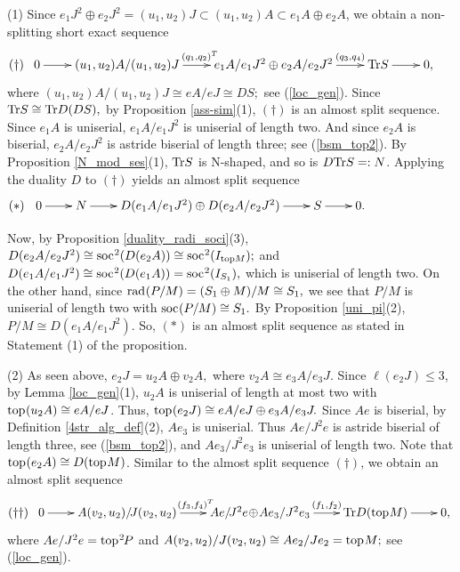\documentclass[10pt]{amsart}
\theoremstyle{definition}
\newcommand{\rad}{{\rm rad}\hspace{.5pt}}
\newcommand{\soc}{{\rm soc}\hspace{.5pt}}
\newcommand{\ntop}{{\rm top}\hspace{.5pt}}
\begin{document}
(1) Since $e_1J^2\oplus e_2J^2=(u_1, u_2)J\subset (u_1, u_2)A \subset e_1A\oplus e_2A$, we obtain a non-splitting short exact sequence \vspace{-7pt}
$$\hspace{-13pt}(\dagger) \hspace{5pt} \xymatrixcolsep{22pt}\xymatrix{0\ar[r] & (u_1, u_2)A/(u_1, u_2)J \ar[r]^-{(q_1, q_2)^T\hspace{-5pt}} & e_1A/e_1J^2 \oplus  e_2A/e_2J^2 \ar[r]^-{(q_3, q_4)} & {\rm Tr}S \ar[r] & 0,}\vspace{-3pt}$$ where $(u_1, u_2)A/(u_1, u_2)J\cong eA/eJ\cong DS;$ see (\ref{loc_gen}). Since ${\rm Tr} S \cong {\rm Tr} D(DS),$ by Proposition \ref{ass-sim}(1), $(\dagger)$ is an almost split sequence. Since $e_1A$ is uniserial, $e_1A/e_1J^2$ is uniserial of length two. And since $e_2A$ is biserial, $e_2A/e_2J^2$ is astride biserial of length three; see (\ref{bsm_top2}). By Proposition \ref{N_mod_ses}(1), ${\rm Tr}S$ is N-shaped, and so is $D{\rm Tr} S=:N$. Applying the duality $D$ to $(\dagger)$ yields an almost split sequence \vspace{-3pt}
$$\hspace{-68pt} (*) \hspace{6pt} \xymatrixcolsep{21pt}\xymatrix{0\ar[r] & N\ar[r] & D(e_1A/e_1J^2) \oplus D(e_2A/e_2J^2) \ar[r] & S \ar[r] & 0.} \vspace{-3pt}$$

Now, by Proposition \ref{duality_radi_soci}(3), $D(e_2A/e_2J^2)\cong \soc^2(D(e_2A))\cong \soc^2(I_{{\rm top}M});$ and $D(e_1A/e_1J^2)\cong \soc^2(D(e_1A))=\soc^2 (I_{S_1}),$ which is uniserial of length two. 
On the other hand, since $\rad(P/M)=(S_1\oplus M)/M\cong S_1,$ we see that $P/M$ is uniserial of length two with $\soc(P/M)\cong S_1.$ By Proposition \ref{uni_pi}(2), $P/M\cong D(e_1A/e_1J^2).$ So,  $(*)$ is an almost split sequence as stated in Statement (1) of the proposition. 

(2) As seen above, $e_2J=u_2A\oplus v_2A,$ where $v_2A\cong e_3A/e_3J.$ 
Since $\ell(e_2J)\le 3$, by Lemma \ref{loc_gen}(1), $u_2A$ is uniserial of length at most two with $\ntop(u_2A)\cong eA/eJ$. Thus, $\ntop(e_2J)\cong eA/eJ \oplus e_3A/e_3J.$ Since $Ae$ is biserial, by Definition \ref{4str_alg_def}(2), $Ae_3$ is uniserial. Thus $Ae/J^2e$ is astride biserial of length three, see (\ref{bsm_top2}), and $Ae_3/J^2e_3$ is uniserial of length two. Note that $\ntop(e_2A)\cong D(\ntop M)$. Similar to the almost split sequence $(\dagger)$, we obtain an almost split sequence \vspace{-6pt} 
$$(\dagger\dagger) \hspace{5pt} \xymatrixcolsep{21pt}\xymatrix{0\ar[r] & A(v_2, u_2)/\! J(v_2, u_2) \ar[r]^-{(f_3, f_4)^T\hspace{-4pt}} & Ae/\! J^2e \! \oplus \! Ae_3/J^2e_3 \ar[r]^-{(f_1, f_2)} & {\rm Tr}D(\ntop M) \ar[r] & 0,}\vspace{-5pt}$$ where $Ae/J^2e=\ntop^2\hspace{-1pt}P$ and $A(v_2, u_2)/J(v_2, u_2)\cong Ae_2/Je_2=\ntop M;$ see (\ref{loc_gen}). 
\end{document}
